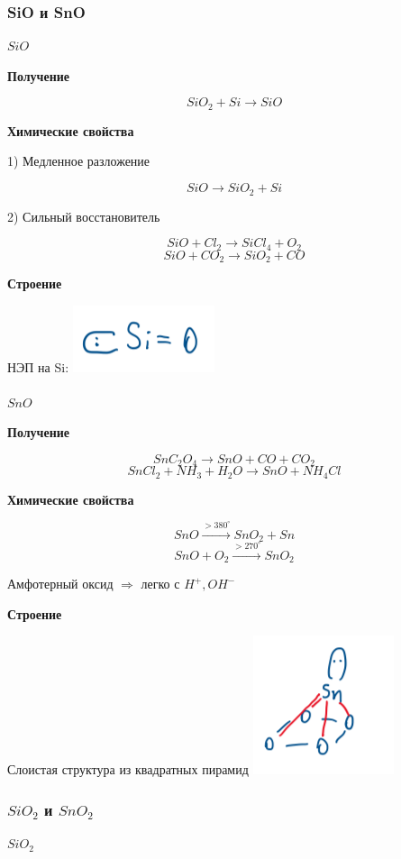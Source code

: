 \documentclass[14pt,a4paper]{scrartcl}
\begin{document}
\subsubsection{SiO и SnO}


$SiO$

\textbf{Получение}

$$SiO_2 + Si \rightarrow SiO$$

\textbf{Химические свойства}

1) Медленное разложение

$$SiO \rightarrow SiO_2 + Si$$

2) Сильный восстановитель

$$SiO + Cl_2 \rightarrow SiCl_4 + O_2$$
$$SiO + CO_2 \rightarrow SiO_2 + CO$$

\textbf{Строение}

НЭП на Si: \includegraphics{10v4.png}\\
\\
$SnO$

\textbf{Получение}

$$SnC_2O_4 \rightarrow SnO + CO + CO_2$$
$$SnCl_2 + NH_3 + H_2O \rightarrow SnO + NH_4Cl$$

\textbf{Химические свойства}

$$SnO \xrightarrow{>380^{\circ}} SnO_2 + Sn$$
$$SnO + O_2 \xrightarrow{>270^{\circ}} SnO_2$$

Амфотерный оксид $\Rightarrow$ легко с $H^+, OH^-$

\textbf{Строение}

Слоистая структура из квадратных пирамид
\includegraphics{10v5.png}

\subsubsection{$SiO_2$ и $SnO_2$}

$SiO_2$
\end{document}
